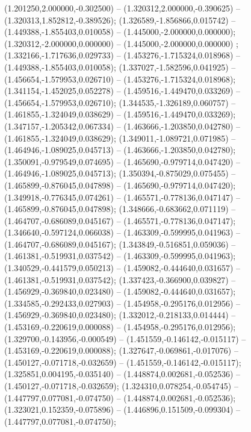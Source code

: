  (1.201250,2.000000,-0.302500) -- (1.320312,2.000000,-0.390625) -- (1.320313,1.852812,-0.389526);
 (1.326589,-1.856866,0.015742) -- (1.449388,-1.855403,0.010058) -- (1.445000,-2.000000,0.000000);
 (1.320312,-2.000000,0.000000) -- (1.445000,-2.000000,0.000000) ;
 (1.332166,-1.717636,0.029733) -- (1.453276,-1.715324,0.018968) -- (1.449388,-1.855403,0.010058);
 (1.337027,-1.582596,0.041925) -- (1.456654,-1.579953,0.026710) -- (1.453276,-1.715324,0.018968);
 (1.341154,-1.452025,0.052278) -- (1.459516,-1.449470,0.033269) -- (1.456654,-1.579953,0.026710);
 (1.344535,-1.326189,0.060757) -- (1.461855,-1.324049,0.038629) -- (1.459516,-1.449470,0.033269);
 (1.347157,-1.205342,0.067334) -- (1.463666,-1.203850,0.042780) -- (1.461855,-1.324049,0.038629);
 (1.349011,-1.089721,0.071985) -- (1.464946,-1.089025,0.045713) -- (1.463666,-1.203850,0.042780);
 (1.350091,-0.979549,0.074695) -- (1.465690,-0.979714,0.047420) -- (1.464946,-1.089025,0.045713);
 (1.350394,-0.875029,0.075455) -- (1.465899,-0.876045,0.047898) -- (1.465690,-0.979714,0.047420);
 (1.349918,-0.776345,0.074261) -- (1.465571,-0.778136,0.047147) -- (1.465899,-0.876045,0.047898);
 (1.348666,-0.683662,0.071119) -- (1.464707,-0.686089,0.045167) -- (1.465571,-0.778136,0.047147);
 (1.346640,-0.597124,0.066038) -- (1.463309,-0.599995,0.041963) -- (1.464707,-0.686089,0.045167);
 (1.343849,-0.516851,0.059036) -- (1.461381,-0.519931,0.037542) -- (1.463309,-0.599995,0.041963);
 (1.340529,-0.441579,0.050213) -- (1.459082,-0.444640,0.031657) -- (1.461381,-0.519931,0.037542);
 (1.337423,-0.366900,0.039827) -- (1.456929,-0.369840,0.023480) -- (1.459082,-0.444640,0.031657);
 (1.334585,-0.292433,0.027903) -- (1.454958,-0.295176,0.012956) -- (1.456929,-0.369840,0.023480);
 (1.332012,-0.218133,0.014444) -- (1.453169,-0.220619,0.000088) -- (1.454958,-0.295176,0.012956);
 (1.329700,-0.143956,-0.000549) -- (1.451559,-0.146142,-0.015117) -- (1.453169,-0.220619,0.000088);
 (1.327647,-0.069861,-0.017076) -- (1.450127,-0.071718,-0.032659) -- (1.451559,-0.146142,-0.015117);
 (1.325851,0.004195,-0.035140) -- (1.448874,0.002681,-0.052536) -- (1.450127,-0.071718,-0.032659);
 (1.324310,0.078254,-0.054745) -- (1.447797,0.077081,-0.074750) -- (1.448874,0.002681,-0.052536);
 (1.323021,0.152359,-0.075896) -- (1.446896,0.151509,-0.099304) -- (1.447797,0.077081,-0.074750);
